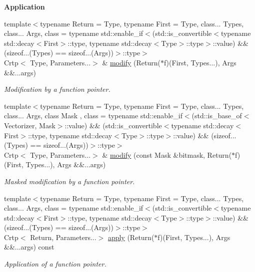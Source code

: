 \begin{Indent}{\bf Application}\par
\begin{DoxyCompactItemize}
\item 
{\footnotesize template$<$typename Return  = Type, typename First  = Type, class... Types, class... Args, class  = typename std\-::enable\-\_\-if$<$(std\-::is\-\_\-convertible$<$typename std\-::decay$<$\-First$>$\-::type, typename std\-::decay$<$\-Type$>$\-::type$>$\-::value) \&\& (sizeof...(\-Types) == sizeof...(\-Args))$>$\-::type$>$ }\\Crtp$<$ Type, Parameters...$>$ \& \hyperlink{classmagrathea_1_1AbstractNArray_a8511c69b75098b4957dec00aa388a510}{modify} (Return($\ast$f)(First, Types...), Args \&\&...args)
\begin{DoxyCompactList}\small\item\em Modification by a function pointer. \end{DoxyCompactList}\item 
{\footnotesize template$<$typename Return  = Type, typename First  = Type, class... Types, class... Args, class Mask , class  = typename std\-::enable\-\_\-if$<$(std\-::is\-\_\-base\-\_\-of$<$\-Vectorizer, Mask$>$\-::value) \&\& (std\-::is\-\_\-convertible$<$typename std\-::decay$<$\-First$>$\-::type, typename std\-::decay$<$\-Type$>$\-::type$>$\-::value) \&\& (sizeof...(\-Types) == sizeof...(\-Args))$>$\-::type$>$ }\\Crtp$<$ Type, Parameters...$>$ \& \hyperlink{classmagrathea_1_1AbstractNArray_a4bd5fb03e3fc390876e41d998336c830}{modify} (const Mask \&bitmask, Return($\ast$f)(First, Types...), Args \&\&...args)
\begin{DoxyCompactList}\small\item\em Masked modification by a function pointer. \end{DoxyCompactList}\item 
{\footnotesize template$<$typename Return  = Type, typename First  = Type, class... Types, class... Args, class  = typename std\-::enable\-\_\-if$<$(std\-::is\-\_\-convertible$<$typename std\-::decay$<$\-First$>$\-::type, typename std\-::decay$<$\-Type$>$\-::type$>$\-::value) \&\& (sizeof...(\-Types) == sizeof...(\-Args))$>$\-::type$>$ }\\Crtp$<$ Return, Parameters...$>$ \hyperlink{classmagrathea_1_1AbstractNArray_aa950f534b052accbbcdf73a56d65c715}{apply} (Return($\ast$f)(First, Types...), Args \&\&...args) const 
\begin{DoxyCompactList}\small\item\em Application of a function pointer. \end{DoxyCompactList}\item 

\end{DoxyCompactItemize}
\end{Indent}

